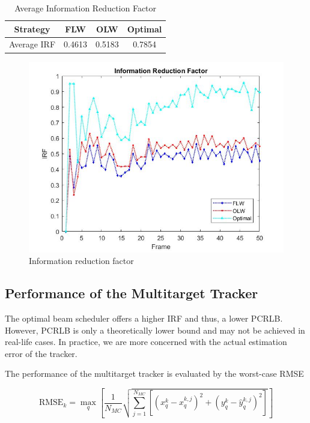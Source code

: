 \documentclass[12pt,journal,draftclsnofoot,onecolumn]{IEEEtran}
\begin{document}
 \begin{table}
	\centering
	\caption{Average Information Reduction Factor}
	\begin{tabular}{cccc}
		\toprule
		Strategy & FLW & OLW & Optimal\\ 
		\midrule
		Average IRF & 0.4613 & 0.5183 & 0.7854\\ 
		\bottomrule
	\end{tabular}
	\label{tab:IRF}
\end{table}

\begin{figure}
	\centering
	\includegraphics[scale=0.36]{IRF.jpg}
	\caption{Information reduction factor}
	\label{fig:IRF}
\end{figure}


\subsection{Performance of the Multitarget Tracker}
The optimal beam scheduler offers a higher IRF and thus, a lower PCRLB. However, PCRLB is only a theoretically lower bound and may not be achieved in real-life cases. In practice, we are more concerned with the actual estimation error of the tracker.

The performance of the multitarget tracker is evaluated by the worst-case RMSE

\begin{equation}
	\text{RMSE}_k = \max_{q}\left[\frac{1} {N_{MC}}\sqrt{\sum_{j=1}^{N_{MC}}\left[\left(x_{q}^{k}-\hat{x}_{q}^{k,j}\right)^{2}+\left(y_{q}^{k}-\hat{y}_{q}^{k,j}\right)^{2}\right]} \right]
\end{equation}
\end{document}
